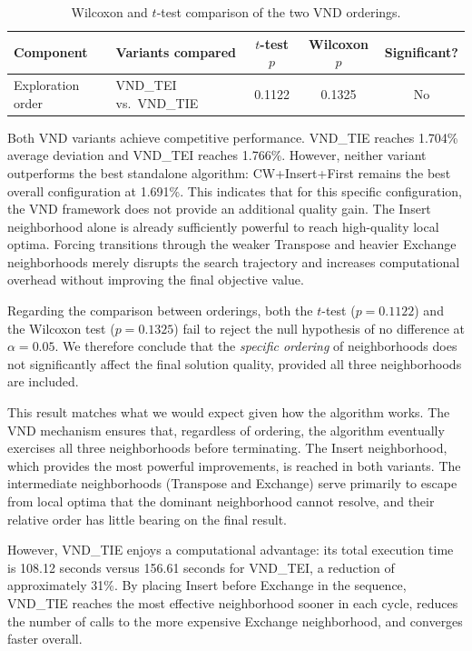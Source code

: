 \documentclass[11pt, a4paper]{article}
\begin{document}
\begin{table}[h]
\centering
\caption{Wilcoxon and $t$-test comparison of the two VND orderings.}
\label{tab:vnd_test}
\begin{tabular}{llccc}
\toprule
\textbf{Component} & \textbf{Variants compared} & \textbf{$t$-test $p$} & \textbf{Wilcoxon $p$} & \textbf{Significant?} \\
\midrule
Exploration order & VND\_TEI vs.\ VND\_TIE & 0.1122 & 0.1325 & No \\
\bottomrule
\end{tabular}
\end{table}

Both VND variants achieve competitive performance. VND\_TIE reaches 1.704\% average deviation and VND\_TEI reaches 1.766\%. However, neither variant outperforms the best standalone algorithm: CW+Insert+First remains the best overall configuration at 1.691\%. This indicates that for this specific configuration, the VND framework does not provide an additional quality gain. The Insert neighborhood alone is already sufficiently powerful to reach high-quality local optima. Forcing transitions through the weaker Transpose and heavier Exchange neighborhoods merely disrupts the search trajectory and increases computational overhead without improving the final objective value.

Regarding the comparison between orderings, both the $t$-test ($p = 0.1122$) and the Wilcoxon test ($p = 0.1325$) fail to reject the null hypothesis of no difference at $\alpha = 0.05$. We therefore conclude that the \emph{specific ordering} of neighborhoods does not significantly affect the final solution quality, provided all three neighborhoods are included.

This result matches what we would expect given how the algorithm works. The VND mechanism ensures that, regardless of ordering, the algorithm eventually exercises all three neighborhoods before terminating. The Insert neighborhood, which provides the most powerful improvements, is reached in both variants. The intermediate neighborhoods (Transpose and Exchange) serve primarily to escape from local optima that the dominant neighborhood cannot resolve, and their relative order has little bearing on the final result.

However, VND\_TIE enjoys a computational advantage: its total execution time is 108.12 seconds versus 156.61 seconds for VND\_TEI, a reduction of approximately 31\%. By placing Insert before Exchange in the sequence, VND\_TIE reaches the most effective neighborhood sooner in each cycle, reduces the number of calls to the more expensive Exchange neighborhood, and converges faster overall. 
\end{document}
